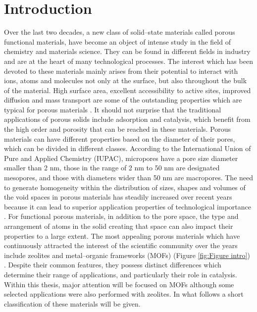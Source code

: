\graphicspath{{figures/}}

\renewcommand\evenpagerightmark{{\scshape\small Introduction}}
\renewcommand\oddpageleftmark{{\scshape\small Chapter 1}}


\hyphenation{}

\chapter[Introduction]%
{Introduction}
\label{ch1}


Over the last two decades, a new class of solid--state materials called porous functional materials, have become an
object of intense study in the field of chemistry and materials science. They
can be found in different fields in industry and are at the heart of many
technological processes.
The interest which has been devoted to these
materials mainly arises from their potential to interact with ions, atoms
and molecules not only at the surface, but also throughout the bulk of the material. 
High surface area, excellent accessibility to active sites, improved diffusion and mass transport are some of the outstanding properties which are
typical for porous materials \cite{Davis2002, Perego2013}.
It should not surprise that the traditional applications of porous solids
include adsorption and catalysis, which benefit from the high order and porosity
that can be reached in these materials. Porous materials can have different properties based on the diameter of their pores, which can be divided in different classes. According to the International Union of Pure and Applied Chemistry (IUPAC), micropores have a pore
size diameter smaller than 2 nm, those in the range of 2 nm to 50 nm
are designated mesopores, and those with diameters wider than 50 nm are
macropores.
The need to generate homogeneity within the distribution of sizes, shapes and volumes of the void spaces in porous materials has steadily 
increased over recent years because it can lead to superior application
properties of technological importance \cite{Sun2016, Davis2002}. For functional
porous materials, in addition to the pore space, the type and arrangement of atoms in the solid creating that space can also impact their properties to a large extent. The most appealing porous materials which have continuously attracted the interest of the scientific
community over the years include zeolites and metal--organic frameworks (MOFs)
(Figure \ref{fig:Figure intro}) \cite{Liang2017}. Despite their common features,
they possess distinct differences which determine their range of applications,
and particularly their role in catalysis. Within this thesis, major attention will be focused on MOFs although some selected applications were also performed with zeolites.
In what follows a short classification of these materials will be given.  

